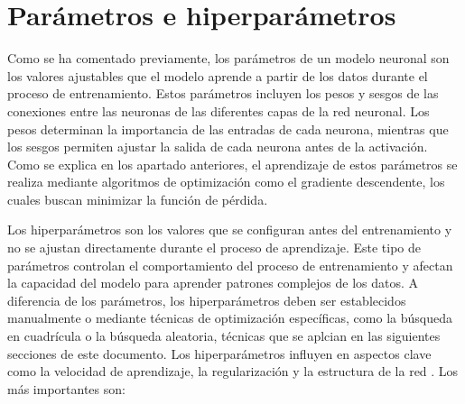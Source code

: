 \section{Parámetros e hiperparámetros}\label{sec:paramhiper}
Como se ha comentado previamente, los parámetros de un modelo neuronal son los valores ajustables que el modelo aprende a partir de los datos durante el proceso de entrenamiento. Estos parámetros incluyen los pesos y sesgos de las conexiones entre las neuronas de las diferentes capas de la red neuronal. Los pesos determinan la importancia de las entradas de cada neurona, mientras que los sesgos permiten ajustar la salida de cada neurona antes de la activación. Como se explica en los apartado anteriores, el aprendizaje de estos parámetros se realiza mediante algoritmos de optimización como el gradiente descendente, los cuales buscan minimizar la función de pérdida. \cite{goodfellow2016deep}


Los hiperparámetros son los valores que se configuran antes del entrenamiento y no se ajustan directamente durante el proceso de aprendizaje. Este tipo de parámetros controlan el comportamiento del proceso de entrenamiento y afectan la capacidad del modelo para aprender patrones complejos de los datos. A diferencia de los parámetros, los hiperparámetros deben ser establecidos manualmente o mediante técnicas de optimización específicas, como la búsqueda en cuadrícula o la búsqueda aleatoria, técnicas que se aplcian en las siguientes secciones de este documento. Los hiperparámetros influyen en aspectos clave como la velocidad de aprendizaje, la regularización y la estructura de la red \cite{chollet2018deep}. Los más importantes son:


